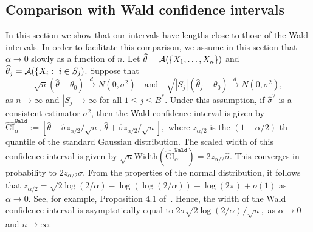 \documentclass{article}
\numberwithin{myalgctr}{section}
\begin{document}
\subsection{Comparison with Wald confidence intervals}\label{subsec:comparison}
In this section
we show that
our intervals have lengths close to those of the Wald intervals. In order to facilitate this comparison, we assume in this section that $\alpha \rightarrow 0$ slowly as a function of $n$.
Let $\widehat\theta = {\cal A}(\{X_1,\ldots, X_n\})$ and
$\widehat\theta_j = {\cal A}(\{X_i:\ i\in S_j)$.
Suppose that
\begin{equation}\label{eq:asymptotic-normality}
\sqrt{n}(\widehat{\theta} - \theta_0) \overset{d}{\to} N(0, \sigma^2)\quad\mbox{and}\quad \sqrt{|S_j|}(\widehat{\theta}_j - \theta_0) \overset{d}{\to} N(0, \sigma^2),
\end{equation}
as $n\to\infty$ and $|S_j| \to \infty$ for all $1\le j\le B^*$. Under
this assumption, if $\widehat{\sigma}^2$ is a consistent estimator
$\sigma^2$, then the Wald confidence interval is given by
$\widehat{\mathrm{CI}}^{\texttt{Wald}}_{\alpha} :=
[\widehat{\theta} -
  \widehat{\sigma}z_{\alpha/2}/{\sqrt{n}},\,\widehat{\theta} +
  \widehat{\sigma}z_{\alpha/2}/{\sqrt{n}}],$ where
$z_{\alpha/2}$ is the $(1-\alpha/2)$-th quantile of the standard
Gaussian distribution.  The {\color{black}scaled} width of this confidence interval is given
by
$\sqrt{n}\mbox{Width}(\widehat{\mathrm{CI}}^{\texttt{Wald}}_{\alpha})
= 2z_{\alpha/2}\widehat{\sigma}.$ This converges in probability to
$2z_{\alpha/2}\sigma$. From the properties of the normal distribution,
it follows that $z_{\alpha/2} = \sqrt{2\log(2/\alpha) -  \log(\log(2/\alpha)) - \log(2\pi)} + o(1)$ as $\alpha\to0$. See, for
example, Proposition 4.1 of~\cite{boucheron2012concentration}. Hence,
the width of the Wald confidence interval is asymptotically equal to
$2\sigma\sqrt{2\log(2/\alpha)}/\sqrt{n},$ as $\alpha \rightarrow 0$ and $n \rightarrow \infty$.
\end{document}

